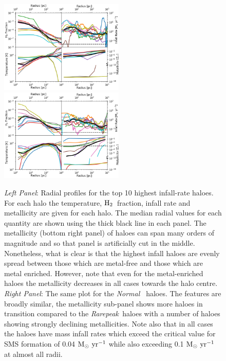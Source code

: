 \documentclass[graphics, twocolumn, usenatbib]{mn2e}
\newcommand{\msolaryr} {$\rm{M_{\odot}~yr^{-1}}~$}
\newcommand{\molH} {$\rm{H_2}$~}
\newcommand{\rarepeak} {\textit{Rarepeak~}}
\newcommand{\normal} {\textit{Normal~}}
\begin{document}
\begin{figure}
\centering
\begin{minipage}{175mm}      \begin{center} 
\centerline{
\includegraphics[width=0.525\textwidth]{FIGURES/MultiPlot_Rarepeak.png}
\includegraphics[width=0.525\textwidth]{FIGURES/MultiPlot_Normal.png}}
\caption{\textit{Left Panel}: Radial profiles for the top 10 highest infall-rate haloes. For
  each halo the temperature, \molH fraction, infall rate and metallicity are given for
  each halo. The median radial values for each quantity are shown using the
  thick black line in each panel. The metallicity (bottom right panel) of haloes can span many
  orders of magnitude and so that panel is artificially cut in the middle. Nonetheless, what is
  clear is that the highest infall haloes are evenly spread between those which are metal-free and
  those which are metal enriched. However, note that even for the metal-enriched haloes the
  metallicity decreases in all cases towards the halo centre. 
  \textit{Right Panel}: The same plot for the \normal
  haloes. The features are broadly similar, the metallicity sub-panel shows more haloes in transition
  compared to the \rarepeak haloes with a number of haloes showing strongly declining metallicities.
  Note also that in all cases the haloes have mass infall rates which exceed the critical value
  for SMS formation of 0.04 \msolaryr while also exceeding 0.1 \msolaryr at almost all radii.
} \label{Fig:RadialProfiles}
\end{center} \end{minipage}

\end{figure}
\end{document}
